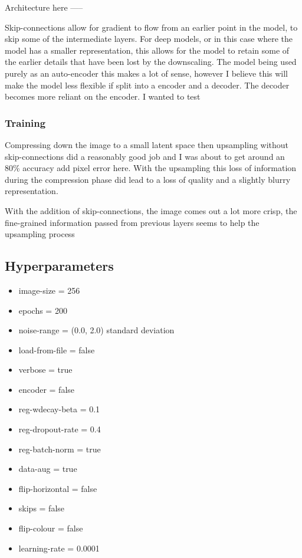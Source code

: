 \documentclass[12pt]{article}
\begin{document}
Architecture here -----

Skip-connections allow for gradient to flow from an earlier point in the model, to skip some of the intermediate layers. For deep models, or in this case where
the model has a smaller representation, this allows for the model to retain some of the earlier details that have been lost by the downscaling. The model being used purely
as an auto-encoder this makes a lot of sense, however I believe this will make the model less flexible if split into a encoder and a decoder. The decoder becomes more reliant
on the encoder. I wanted to test 


\subsubsection{Training}

Compressing down the image to a small latent space then upsampling without skip-connections did a reasonably good job and I was about to get around an 80\% 
accuracy {add pixel error here}. With the upsampling this loss of information during the compression phase did lead to a loss of quality and a slightly blurry
representation.

With the addition of skip-connections, the image comes out a lot more crisp, the fine-grained information passed from previous layers seems to help the upsampling process

\subsection{Hyperparameters}
\begin{itemize}
    \item image-size = 256
    \item epochs = 200
    \item noise-range = (0.0, 2.0) standard deviation
    \item load-from-file = false
    \item verbose = true
    \item encoder = false
    \item reg-wdecay-beta = 0.1
    \item reg-dropout-rate = 0.4
    \item reg-batch-norm = true
    \item data-aug = true
    \item flip-horizontal = false
    \item skips = false
    \item flip-colour = false
    \item learning-rate = 0.0001
\end{itemize}
\end{document}
